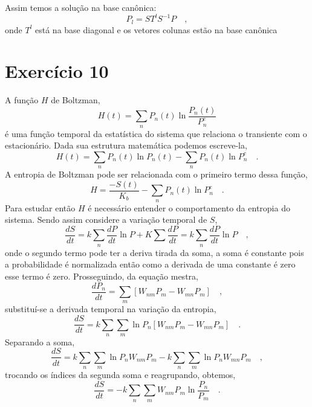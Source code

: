 \documentclass[12pt]{article}
\begin{document}
Assim temos a solução na base canônica:
\begin{equation}
P_l = S T^l S^{-1}  P \quad ,
\end{equation}
onde $T^l$ está na base diagonal e os vetores colunas estão na base canônica

\section*{Exercício 10}
A função $H$ de Boltzman,
\begin{equation}
H(t) = \sum_n P_n(t)\ln\frac{P_n(t)}{P_n^e}
\end{equation}
é uma função temporal da estatística do sistema que relaciona o transiente com o estacionário. Dada sua estrutura matemática podemos escreve-la,
\begin{equation}
H(t) = \sum_n P_n(t) \ln P_n(t) - \sum_n P_n(t)\ln P_n^e \quad.
\end{equation}
A entropia de Boltzman pode ser relacionada com o primeiro termo dessa função, 
\begin{equation}
H = \frac{-S(t)}{K_b} - \sum_n P_n(t)\ln P_n^e \quad.
\end{equation}
Para estudar então $H$ é necessário entender o comportamento da entropia do sistema. Sendo assim considere a variação temporal de $S$,
\begin{equation}
\frac{d S}{dt} = k\sum_n \frac{dP}{dt}\ln P + K\sum \frac{dP}{dt} = k\sum_n \frac{dP}{dt}\ln P \quad,
\end{equation}
onde o segundo termo pode ter a deriva tirada da soma, a soma é constante pois a probabilidade é normalizada então como a derivada de uma constante é zero esse termo é zero. Prosseguindo, da equação mestra, 
\begin{equation}
\frac{dP_n}{dt} = \sum_m \left[W_{nm}P_m - W_{mn}P_m\right] \quad,
\end{equation}
substituí-se a derivada temporal na variação da entropia,
\begin{equation}
\frac{dS}{dt} = k \sum_n\sum_m \ln P_n \left[W_{nm}P_m - W_{mn}P_m\right] \quad.
\end{equation}
Separando a soma,
\begin{equation}
\frac{dS}{dt} = k \sum_n\sum_m \ln P_n W_{nm}P_m -k\sum_n\sum_m \ln P_n W_{mn}P_m \quad,
\end{equation}
trocando os índices da segunda soma e reagrupando, obtemos,
\begin{equation}
\frac{dS}{dt} = -k \sum_n\sum_m W_{nm}P_m\ln\frac{P_n}{P_m} \quad.
\end{equation}
\end{document}

